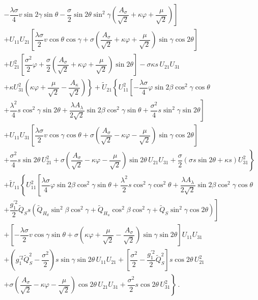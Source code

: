 \documentclass[12pt,a4paper]{article}
\begin{document}
$$
\begin{array}{l}
\left.\left.-\dfrac{\lambda\sigma}{4} v \sin 2\gamma \sin\theta
- \dfrac{\sigma}{2}\sin 2\theta \sin^2\gamma\left(\dfrac{A_{\sigma}}{\sqrt{2}}+\kappa\varphi
+\dfrac{\mu}{\sqrt{2}}\right)\right] \right.\\[1mm]
\left.+ U_{11} U_{21} \left[\dfrac{\lambda\sigma}{2}v\cos\theta\cos\gamma
+\sigma\left(\dfrac{A_{\sigma}}{\sqrt{2}}+\kappa\varphi+\dfrac{\mu}{\sqrt{2}}\right)\sin\gamma\cos 2\theta\right] \right.\\[1mm]
\left.+U_{21}^2 \left[\dfrac{\sigma^2}{2}\varphi+\dfrac{\sigma}{2}\left(\dfrac{A_{\sigma}}{\sqrt{2}}+\kappa\varphi
+\dfrac{\mu}{\sqrt{2}}\right)\sin 2\theta\right]-\sigma\kappa s\, U_{21} U_{31}\right.\\[1mm]
\left.+\kappa U_{31}^2 \left(\kappa\varphi
+\dfrac{\mu}{\sqrt{2}} - \dfrac{A_{\kappa}}{\sqrt{2}}\right)
\right\}+\tilde{U}_{21}\left\{U_{11}^2 \left[-\dfrac{\lambda\sigma}{4}\varphi \sin 2\beta \cos^2\gamma \cos\theta \right.\right.\\[1mm]
\left.\left.+ \dfrac{\lambda^2}{4}s\cos^2 \gamma \sin 2\theta + \dfrac{\lambda A_{\lambda}}{2\sqrt{2}}\sin 2\beta \cos^2 \gamma \sin\theta
+\dfrac{\sigma^2}{4}s \sin^2 \gamma \sin 2\theta\right]\right.\\[1mm]
\left. + U_{11} U_{31}\left[\dfrac{\lambda\sigma}{2}v\cos\gamma\cos\theta+\sigma\left(\dfrac{A_{\sigma}}{\sqrt{2}}-\kappa\varphi
-\dfrac{\mu}{\sqrt{2}}\right) \sin\gamma \cos 2\theta \right]\right.\\[1mm]
\left. + \dfrac{\sigma^2}{4}s\sin 2\theta\, U_{21}^2+\sigma\left(\dfrac{A_{\sigma}}{\sqrt{2}}-\kappa\varphi
-\dfrac{\mu}{\sqrt{2}}\right)\sin 2\theta\, U_{21} U_{31}+\dfrac{\sigma}{2}\left(\sigma s \sin 2\theta + \kappa s\right) U_{31}^2 \right\}\\[1mm]
+\tilde{U}_{11}\left\{U_{11}^2 \left[\dfrac{\lambda\sigma}{4}\varphi \sin 2\beta \cos^2\gamma \sin\theta
+ \dfrac{\lambda^2}{2}s\cos^2 \gamma \cos^2 \theta + \dfrac{\lambda A_{\lambda}}{2\sqrt{2}}\sin 2\beta \cos^2 \gamma \cos\theta\right.\right.\\[1mm]
\left.\left.+\dfrac{g_1^{'2}}{2} \tilde{Q}_{S} s \left(\tilde{Q}_{H_d}\sin^2\beta \cos^2\gamma +
\tilde{Q}_{H_u}\cos^2\beta \cos^2\gamma + \tilde{Q}_{S}\sin^2\gamma \cos 2\theta\right)\right]\right.\\[1mm]
\left.+\left[-\dfrac{\lambda\sigma}{2}v\cos\gamma\sin\theta+\sigma\left(\kappa\varphi+\dfrac{\mu}{\sqrt{2}}
-\dfrac{A_{\sigma}}{\sqrt{2}}\right)\sin\gamma \sin 2\theta \right] U_{11} U_{31} \right.\\[1mm]
\left. + \left( g_1^{'2} \tilde{Q}_{S}^2 - \dfrac{\sigma^2}{2} \right) s \sin\gamma \sin 2\theta\, U_{11} U_{21} +
\left[ \dfrac{\sigma^2}{2} - \dfrac{g_1^{'2}}{2} \tilde{Q}_{S}^2\right] s \cos 2\theta\, U_{21}^2\right.\\[1mm]
\left.+ \sigma\left(\dfrac{A_{\sigma}}{\sqrt{2}}-\kappa\varphi-\dfrac{\mu}{\sqrt{2}}\right)\cos 2\theta\, U_{21} U_{31}
+\dfrac{\sigma^2}{2}s\cos 2\theta\, U_{31}^2\right\}\,.
\end{array}
$$
\end{document}

